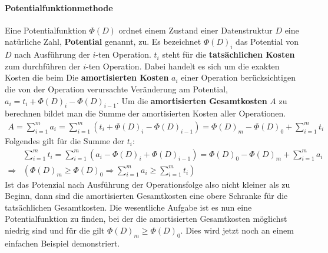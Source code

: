 \documentclass[a4paper,12pt]{article}
\begin{document}
\paragraph{Potentialfunktionmethode} Eine Potentialfunktion $\Phi(D)$ ordnet einem Zustand einer Datenstruktur $D$ eine natürliche Zahl, \textbf{Potential} genannt, zu. Es bezeichnet $\Phi(D)_{i}$ das Potential von $D$ nach Ausführung der $i$-ten Operation. $t_i$ steht für die \textbf{tatsächlichen Kosten} zum durchführen der $i$-ten Operation. Dabei handelt es sich um die exakten Kosten die beim Die \textbf{amortisierten Kosten} $a_i$ einer Operation berücksichtigen die von der Operation verursachte Veränderung am Potential, $a_i = t_i + \Phi(D)_{i} - \Phi(D)_{i-1}$. Um die \textbf{amortisierten Gesamtkosten} $A$ zu berechnen bildet man die Summe der amortisierten Kosten aller Operationen. 
\begin{align*}
A = \sum_{i = 1}^{m} a_i =  \sum_{i = 1}^{m} \left(t_i + \Phi\left(D\right)_{i} - \Phi\left(D\right)_{i-1}\right) = \Phi\left(D\right)_{m} - \Phi\left(D\right)_{0} + \sum_{i = 1}^{m} t_i 
\end{align*}
Folgendes gilt für die Summe der $t_i$:
\begin{align*}
&\sum_{i = 1}^{m} t_i =  \sum_{i = 1}^{m} \left(a_i - \Phi\left(D\right)_{i} + \Phi\left(D\right)_{i-1}\right) = \Phi\left(D\right)_{0} - \Phi\left(D\right)_{m} + \sum_{i = 1}^{m} a_i \\
\Rightarrow &\left( \Phi\left(D\right)_{m} \geq \Phi\left(D\right)_{0} \Rightarrow \sum_{i = 1}^{m} a_i \geq \sum_{i = 1}^{m} t_i \right)
\end{align*}
Ist das Potenzial nach Ausführung der Operationsfolge also nicht kleiner als zu Beginn, dann sind die amortisierten Gesamtkosten eine obere Schranke für die tatsächlichen Gesamtkosten. Die wesentliche Aufgabe ist es nun eine Potentialfunktion zu finden, bei der die amortisierten Gesamtkosten möglichst niedrig sind und für die gilt $\Phi\left(D\right)_{m} \geq \Phi\left(D\right)_{0}$. Dies wird jetzt noch an einem einfachen Beispiel demonstriert.
\end{document}
